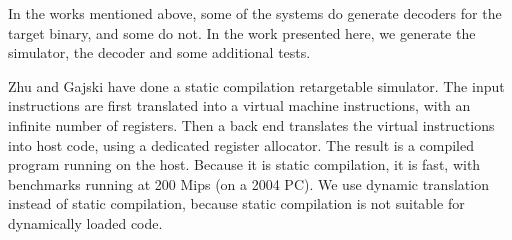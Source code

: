 \documentclass[conference]{ieeeconf}
\begin{document}

In the works mentioned above, some of the systems do generate decoders
for the target binary, and some do not.  In the work presented here,
we generate the simulator, the decoder and some additional tests.



Zhu and Gajski \cite{staticISS-zhu-gajski} have done a static
compilation retargetable simulator. The input instructions are first
translated into a virtual machine instructions, with an infinite
number of registers. Then a back end translates the virtual
instructions into host code, using a dedicated register allocator.
The result is a compiled program running on the host.  Because it is
static compilation, it is fast, with benchmarks running at 200 Mips
(on a 2004 PC).
We use dynamic translation instead of static compilation, because
static compilation is not suitable for dynamically loaded code.


\end{document}
